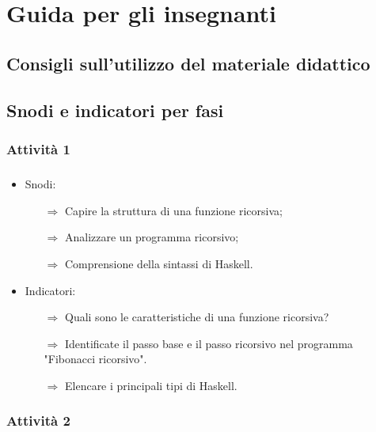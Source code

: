\chapter{Guida per gli insegnanti}

\section{Consigli sull'utilizzo del materiale didattico}

\section{Snodi e indicatori per fasi}

\subsection{Attività 1}

\paragraph{}

\begin{itemize}
    \item Snodi:
    \begin{itemize}
        \item [$\Rightarrow$] Capire la struttura di una funzione ricorsiva;
        \item [$\Rightarrow$] Analizzare un programma ricorsivo;
        \item [$\Rightarrow$] Comprensione della sintassi di Haskell.
    \end{itemize}
    \item Indicatori:
    \begin{itemize}
        \item [$\Rightarrow$] Quali sono le caratteristiche di una funzione ricorsiva?
        \item [$\Rightarrow$] Identificate il passo base e il passo ricorsivo nel programma
                              "Fibonacci ricorsivo".
        \item [$\Rightarrow$] Elencare i principali tipi di Haskell.
    \end{itemize}
\end{itemize}

\subsection{Attività 2}

